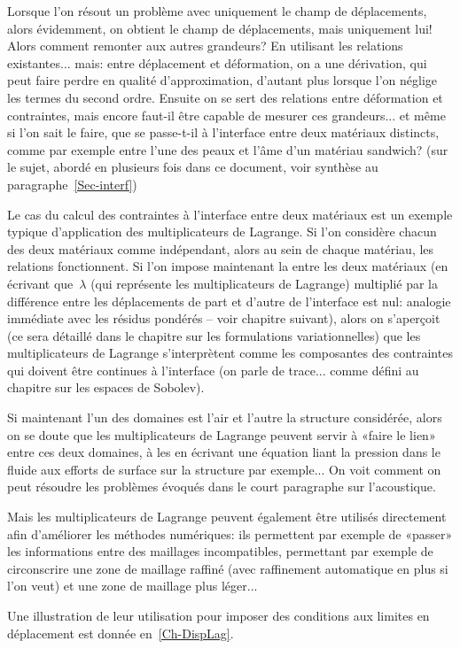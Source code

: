 Lorsque l'on résout un problème avec uniquement le champ de déplacements, alors évidemment, on obtient le champ de déplacements, mais uniquement lui! Alors comment remonter aux autres grandeurs? En utilisant les relations existantes... mais: entre déplacement et déformation, on a une dérivation, qui peut faire perdre en qualité d'approximation, d'autant plus lorsque l'on néglige les termes du second ordre.
Ensuite on se sert des relations entre déformation et contraintes, mais encore faut-il être capable de mesurer ces grandeurs... et même si l'on sait le faire, que se passe-t-il à l'interface entre deux matériaux distincts, comme par exemple entre l'une des peaux et l'âme d'un matériau sandwich? (sur le sujet, abordé en plusieurs fois dans ce document, voir synthèse au paragraphe~\ref{Sec-interf})

\medskip
Le cas du calcul des contraintes à l'interface entre deux matériaux est un exemple typique d'application des multiplicateurs de Lagrange. Si l'on considère chacun des deux matériaux comme indépendant, alors au sein de chaque matériau, les relations fonctionnent.
Si l'on impose maintenant la  entre les deux matériaux (en écrivant que~$\lambda$ (qui représente les multiplicateurs de Lagrange) multiplié par la différence entre les déplacements de part et d'autre de l'interface est nul: analogie immédiate avec les résidus pondérés -- voir chapitre suivant), alors on s'aperçoit (ce sera détaillé dans le chapitre sur les formulations variationnelles) que les multiplicateurs de Lagrange s'interprètent comme les composantes des contraintes qui doivent être continues à l'interface (on parle de trace... comme défini au chapitre sur les espaces de Sobolev).

\medskip
Si maintenant l'un des domaines est l'air et l'autre la structure considérée, alors on se doute que les multiplicateurs de Lagrange peuvent servir à «faire le lien» entre ces deux domaines, à les  en écrivant une équation liant la pression dans le fluide aux efforts de surface sur la structure par exemple... On voit comment on peut résoudre les problèmes évoqués dans le court paragraphe sur l'acoustique.

\medskip
Mais les multiplicateurs de Lagrange peuvent également être utilisés directement afin d'améliorer les méthodes numériques: ils permettent par exemple de «passer» les informations entre des maillages incompatibles, permettant par exemple de circonscrire une zone de maillage raffiné (avec raffinement automatique en plus si l'on veut) et une zone de maillage plus léger...

Une illustration de leur utilisation pour imposer des conditions aux limites en déplacement est donnée en~\ref{Ch-DispLag}.

\medskip
{}



